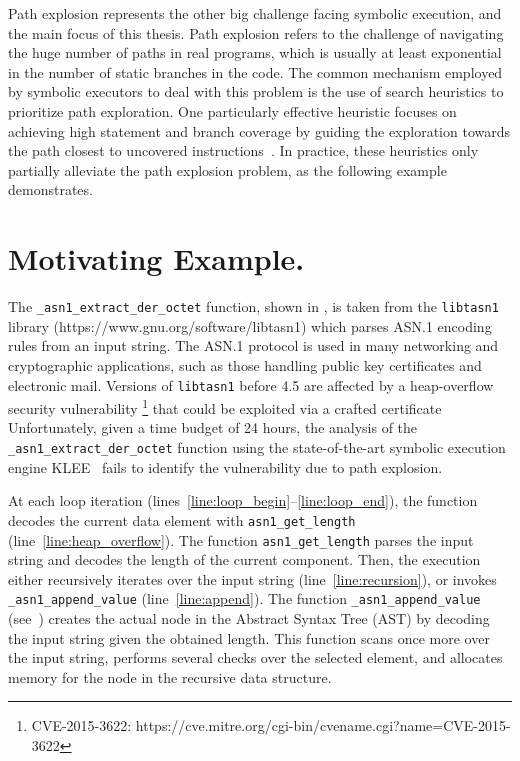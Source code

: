 Path explosion represents the other big challenge facing symbolic execution,
and the main focus of this thesis.
Path explosion refers to the challenge of navigating the huge number of paths in real programs,
which is usually at least exponential in the number of static branches in the code.
The common mechanism employed by symbolic executors to
deal with this problem is the use of search heuristics to prioritize path exploration.
One particularly effective heuristic focuses on
achieving high statement and branch coverage by guiding the
exploration towards the path closest to uncovered
instructions~\cite{exe,klee,sen:concolicheuristics,fitsymex:dsn09}.
In practice, these heuristics only partially alleviate the path
explosion problem, as the following example demonstrates.

\section{Motivating Example.}
The \texttt{\_asn1\_extract\_der\_octet} function, shown in ,
is taken from the \texttt{libtasn1} library (https://www.gnu.org/software/libtasn1)
which parses ASN.1 encoding rules from an input string.
The ASN.1 protocol is used in many networking and
cryptographic applications, such as those handling public key
certificates and electronic mail.
Versions of \texttt{libtasn1} before 4.5 are affected by a heap-overflow 
security vulnerability \footnote{CVE-2015-3622: https://cve.mitre.org/cgi-bin/cvename.cgi?name=CVE-2015-3622}
that could be exploited via a crafted certificate
Unfortunately, given a time budget of 24 hours,
the analysis of the \texttt{\_asn1\_extract\_der\_octet} function using
the state-of-the-art symbolic execution engine KLEE~\cite{klee} fails
to identify the vulnerability due to path explosion.

At each loop iteration (lines~\ref{line:loop_begin}--\ref{line:loop_end}),
the function decodes the current data element with \texttt{asn1\_get\_length} (line~\ref{line:heap_overflow}).
The function \texttt{asn1\_get\_length} parses the input string and decodes the length of the current component.
Then, the execution either recursively iterates over the input string (line~\ref{line:recursion}),
or invokes \texttt{\_asn1\_append\_value} (line~\ref{line:append}).
The function \texttt{\_asn1\_append\_value} (see~) creates the
actual node in the Abstract Syntax Tree (AST) by decoding the input
string given the obtained length. This function scans once more over
the input string, performs several checks over the selected element,
and allocates memory for the node in the recursive data structure.

